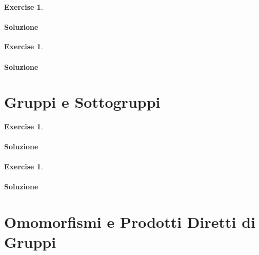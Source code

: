 \documentclass{article}
\theoremstyle{plain}
\theoremstyle{definition}
\newtheorem{xca}[exmp]{Exercise}
\theoremstyle{remark}
\begin{document}
\vspace{10pt}

\begin{bxthm}
\begin{xca}

\end{xca}
\end{bxthm}
\paragraph{Soluzione}

\vspace{10pt}

\begin{bxthm}
\begin{xca}

\end{xca}
\end{bxthm}
\paragraph{Soluzione}

\newpage
\section{Gruppi e Sottogruppi}
\vspace{20pt}

\vspace{10pt}

\begin{bxthm}
\begin{xca}

\end{xca}
\end{bxthm}
\paragraph{Soluzione}

\vspace{10pt}

\begin{bxthm}
\begin{xca}

\end{xca}
\end{bxthm}
\paragraph{Soluzione}

\newpage
\section{Omomorfismi e Prodotti Diretti di Gruppi}
\vspace{20pt}
\end{document}
